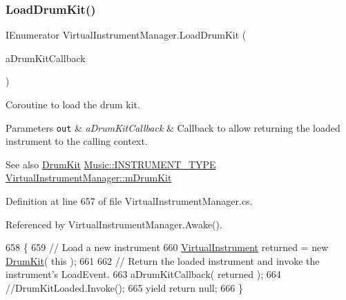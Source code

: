 \subsubsection{\texorpdfstring{Load\+Drum\+Kit()}{LoadDrumKit()}}
{\footnotesize\ttfamily I\+Enumerator Virtual\+Instrument\+Manager.\+Load\+Drum\+Kit (\begin{DoxyParamCaption}\item[{System.\+Action$<$ \hyperlink{class_virtual_instrument}{Virtual\+Instrument} $>$}]{a\+Drum\+Kit\+Callback }\end{DoxyParamCaption})\hspace{0.3cm}{\ttfamily [private]}}



Coroutine to load the drum kit. 


\begin{DoxyParams}[1]{Parameters}
\mbox{\tt out}  & {\em a\+Drum\+Kit\+Callback} & Callback to allow returning the loaded instrument to the calling context.\\
\hline
\end{DoxyParams}
\begin{DoxySeeAlso}{See also}
\hyperlink{class_drum_kit}{Drum\+Kit} \hyperlink{group___music_enums_gabfce60192305965558a36e368ebd67c3}{Music\+::\+I\+N\+S\+T\+R\+U\+M\+E\+N\+T\+\_\+\+T\+Y\+PE} \hyperlink{group___v_i_m_priv_ga0bc7c9f776b0d2dae0ccb1f1ee5f2143}{Virtual\+Instrument\+Manager\+::m\+Drum\+Kit} 
\end{DoxySeeAlso}


Definition at line 657 of file Virtual\+Instrument\+Manager.\+cs.



Referenced by Virtual\+Instrument\+Manager.\+Awake().


\begin{DoxyCode}
658     \{
659         \textcolor{comment}{// Load a new instrument}
660         \hyperlink{class_virtual_instrument}{VirtualInstrument} returned = \textcolor{keyword}{new} \hyperlink{class_drum_kit}{DrumKit}( \textcolor{keyword}{this} );
661 
662         \textcolor{comment}{// Return the loaded instrument and invoke the instrument's LoadEvent.}
663         aDrumKitCallback( returned );
664         \textcolor{comment}{//DrumKitLoaded.Invoke();}
665         yield \textcolor{keywordflow}{return} null;
666     \}
\end{DoxyCode}
\mbox{\label{group___v_i_m_coroutines_gab8082c1cc590771bf57da8b5ae8603d1}} 

